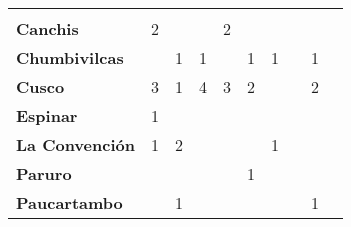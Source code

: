 \begin{tabular}{lccccccccc}
	&\cellcolor[HTML]{FCC46C}\\
	\textbf{Canchis}                            
	&2                 			  				&\cellcolor[HTML]{FCC46C}                   &\cellcolor[HTML]{FCC46C}                   &2         &\cellcolor[HTML]{FCC46C}                	&\cellcolor[HTML]{FCC46C}              &\cellcolor[HTML]{FCC46C} 		  			&\cellcolor[HTML]{FCC46C} 
	&\cellcolor[HTML]{FCC46C}\\
	\textbf{Chumbivilcas}                      
	&\cellcolor[HTML]{FCC46C}        			&1                   &1                    						&\cellcolor[HTML]{FCC46C}                               &1                  						&1            								&\cellcolor[HTML]{FCC46C}   			    &1 
	&\cellcolor[HTML]{FCC46C}\\
	\textbf{Cusco}                             
	&3                  			 			&1                    				        &4                                          &3                    			 			&2                  
	&\cellcolor[HTML]{FCC46C}                   &\cellcolor[HTML]{FCC46C}    	 
	&2 											&\cellcolor[HTML]{FCC46C} \\
	\textbf{Espinar}       					   
	&1                						   
	&\cellcolor[HTML]{FCC46C}                   &\cellcolor[HTML]{FCC46C}        &\cellcolor[HTML]{FCC46C}                   &\cellcolor[HTML]{FCC46C}                   &\cellcolor[HTML]{FCC46C}  		            &\cellcolor[HTML]{FCC46C} 
	&\cellcolor[HTML]{FCC46C} 					&\cellcolor[HTML]{FCC46C} \\
	\textbf{La Convención}                     
	&1                               			&2                     					    &\cellcolor[HTML]{FCC46C}                   &\cellcolor[HTML]{FCC46C}                   &\cellcolor[HTML]{FCC46C}                   &1              							&\cellcolor[HTML]{FCC46C} 					&\cellcolor[HTML]{FCC46C}
	&\cellcolor[HTML]{FCC46C}   \\
	\textbf{Paruro}                            
	&\cellcolor[HTML]{FCC46C}       	 		&\cellcolor[HTML]{FCC46C}              	    &\cellcolor[HTML]{FCC46C}                   &\cellcolor[HTML]{FCC46C}              	    
	&1        
	&\cellcolor[HTML]{FCC46C}                   &\cellcolor[HTML]{FCC46C}   				
	&\cellcolor[HTML]{FCC46C} 					&\cellcolor[HTML]{FCC46C}   \\
	\textbf{Paucartambo}               		   
	&\cellcolor[HTML]{FCC46C}        			&1                      
	&\cellcolor[HTML]{FCC46C}                   &\cellcolor[HTML]{FCC46C}       &\cellcolor[HTML]{FCC46C}                      
	&\cellcolor[HTML]{FCC46C}                   & \cellcolor[HTML]{FCC46C} 		 &1

\end{tabular}
